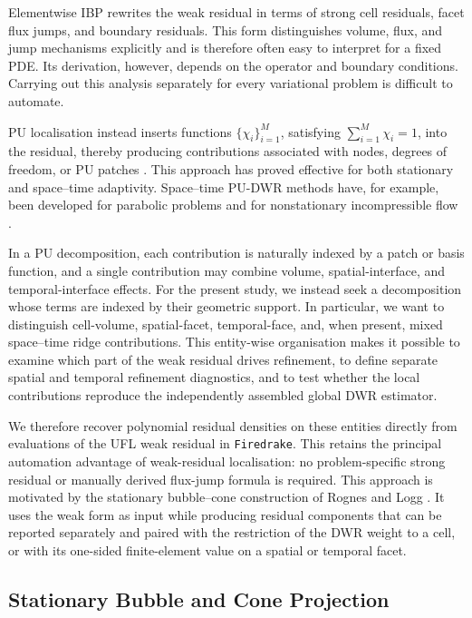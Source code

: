Elementwise IBP rewrites the weak residual in terms of strong cell residuals, facet flux jumps, and boundary residuals. This form distinguishes volume, flux, and jump mechanisms explicitly and is therefore often easy to interpret for a fixed PDE. Its derivation, however, depends on the operator and boundary conditions. Carrying out this analysis separately for every variational problem is difficult to automate.

PU localisation instead inserts functions \(\{\chi_i\}_{i=1}^M\), satisfying \(\sum_{i=1}^M\chi_i=1\), into the residual, thereby producing contributions associated with nodes, degrees of freedom, or PU patches \cite{Richter_Wick_2015}. This approach has proved effective for both stationary and space--time adaptivity. Space--time PU-DWR methods have, for example, been developed for parabolic problems \cite{ThieleWick2024,R6} and for nonstationary incompressible flow \cite{non-flow}. 

In a PU decomposition, each contribution is naturally indexed by a patch or basis function, and a single contribution may combine volume, spatial-interface, and temporal-interface effects. For the present study, we instead seek a decomposition whose terms are indexed by their geometric support. In particular, we want to distinguish cell-volume, spatial-facet, temporal-face, and, when present, mixed space--time ridge contributions. This entity-wise organisation makes it possible to examine which part of the weak residual drives refinement, to define separate spatial and temporal refinement diagnostics, and to test whether the local contributions reproduce the independently assembled global DWR estimator.

We therefore recover polynomial residual densities on these entities directly from evaluations of the UFL weak residual in \texttt{Firedrake}. This retains the principal automation advantage of weak-residual localisation: no problem-specific strong residual or manually derived flux-jump formula is required. 
This approach is motivated by the stationary bubble--cone construction of Rognes and Logg \cite{Rognes_Logg_2013}. It uses the weak form as input while producing residual components that can be reported separately and paired with the restriction of the DWR weight to a cell, or with its one-sided finite-element value on a spatial or temporal facet.


\subsection{Stationary Bubble and Cone Projection}
\label{sec:stationary-residual-recovery}

